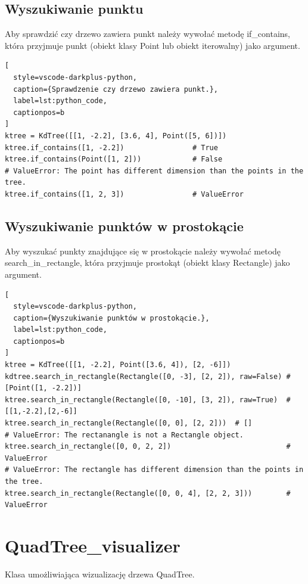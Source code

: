 \documentclass{lab}
\begin{document}
\subsection{Wyszukiwanie punktu}
Aby sprawdzić czy drzewo zawiera punkt należy wywołać metodę if\_contains, która przyjmuje punkt (obiekt klasy Point lub obiekt iterowalny) jako argument.
\begin{lstlisting}[
  style=vscode-darkplus-python,
  caption={Sprawdzenie czy drzewo zawiera punkt.},
  label=lst:python_code,
  captionpos=b
]
ktree = KdTree([[1, -2.2], [3.6, 4], Point([5, 6])])
ktree.if_contains([1, -2.2])                # True
ktree.if_contains(Point([1, 2]))            # False
# ValueError: The point has different dimension than the points in the tree.
ktree.if_contains([1, 2, 3])                # ValueError
\end{lstlisting}

\subsection{Wyszukiwanie punktów w prostokącie}
Aby wyszukać punkty znajdujące się w prostokącie należy wywołać metodę search\_in\_rectangle, która przyjmuje prostokąt (obiekt klasy Rectangle) jako argument.
\begin{lstlisting}[
  style=vscode-darkplus-python,
  caption={Wyszukiwanie punktów w prostokącie.},
  label=lst:python_code,
  captionpos=b
]
ktree = KdTree([[1, -2.2], Point([3.6, 4]), [2, -6]])
kdtree.search_in_rectangle(Rectangle([0, -3], [2, 2]), raw=False) # [Point([1, -2.2])]
ktree.search_in_rectangle(Rectangle([0, -10], [3, 2]), raw=True)  # [[1,-2.2],[2,-6]]
ktree.search_in_rectangle(Rectangle([0, 0], [2, 2]))  # []
# ValueError: The rectanangle is not a Rectangle object.
ktree.search_in_rectangle([0, 0, 2, 2])                           # ValueError
# ValueError: The rectangle has different dimension than the points in the tree.
ktree.search_in_rectangle(Rectangle([0, 0, 4], [2, 2, 3]))        # ValueError
\end{lstlisting}

\section{QuadTree\_visualizer}
Klasa umożliwiająca wizualizację drzewa QuadTree.
\end{document}
